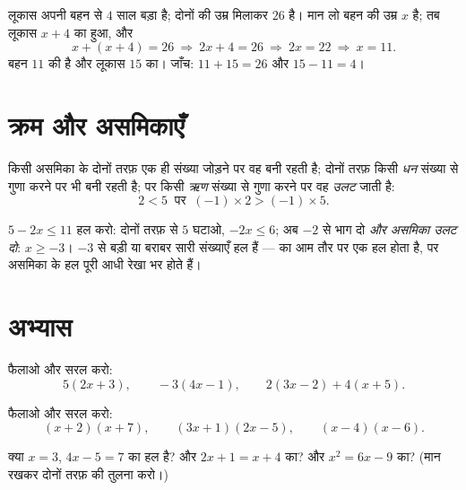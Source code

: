 \begin{example}\label{ex:g8:equations:problem}
लूकास अपनी बहन से $4$ साल बड़ा है; दोनों की उम्र मिलाकर $26$ है।
मान लो बहन की उम्र $x$ है; तब लूकास $x + 4$ का हुआ, और
\[
x + (x + 4) = 26
\ \Longrightarrow\
2x + 4 = 26
\ \Longrightarrow\
2x = 22
\ \Longrightarrow\
x = 11 .
\]
बहन $11$ की है और लूकास $15$ का। जाँच: $11 + 15 = 26$ और
$15 - 11 = 4$।
\end{example}

\section{क्रम और असमिकाएँ}

\begin{proposition}[संक्रियाएँ और क्रम]\label{prop:g8:equations:order}
किसी असमिका के दोनों तरफ़ एक ही संख्या जोड़ने पर वह बनी रहती है;
दोनों तरफ़ किसी \emph{धन} संख्या से गुणा करने पर भी बनी रहती है; पर
किसी \emph{ऋण} संख्या से गुणा करने पर वह \emph{उलट} जाती है:
\[
2 < 5 \ \text{ पर }\ (-1) \times 2 > (-1) \times 5 .
\]
\end{proposition}
\admitted

\begin{example}\label{ex:g8:equations:inequality}
$5 - 2x \leq 11$ हल करो: दोनों तरफ़ से $5$ घटाओ, $-2x \leq 6$; अब
$-2$ से भाग दो \emph{और असमिका उलट दो}: $x \geq -3$। $-3$ से बड़ी
या बराबर सारी संख्याएँ हल हैं ---  का आम तौर पर एक हल होता
है, पर असमिका के हल पूरी आधी रेखा भर होते हैं।
\end{example}

\section{अभ्यास}

\begin{exercise}[$\star$]\label{exo:g8:equations:1}
फैलाओ और सरल करो:
\[
5(2x + 3), \qquad
-3(4x - 1), \qquad
2(3x - 2) + 4(x + 5).
\]
\end{exercise}

\begin{exercise}[$\star$]\label{exo:g8:equations:2}
फैलाओ और सरल करो:
\[
(x + 2)(x + 7), \qquad
(3x + 1)(2x - 5), \qquad
(x - 4)(x - 6).
\]
\end{exercise}

\begin{exercise}[$\star$]\label{exo:g8:equations:3}
क्या $x = 3$, $4x - 5 = 7$ का हल है? और $2x + 1 = x + 4$ का? और
$x^2 = 6x - 9$ का? (मान रखकर दोनों तरफ़ की तुलना करो।)
\end{exercise}

